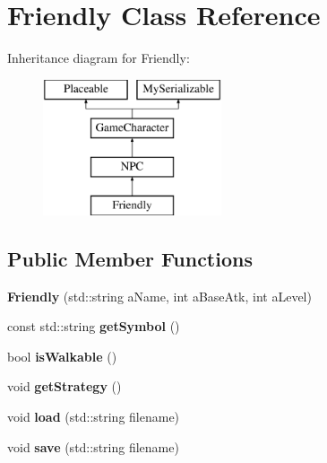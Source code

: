 \hypertarget{class_friendly}{}\section{Friendly Class Reference}
\label{class_friendly}
Inheritance diagram for Friendly\+:\begin{figure}[H]
\begin{center}
\leavevmode
\includegraphics[height=4.000000cm]{class_friendly}
\end{center}
\end{figure}
\subsection*{Public Member Functions}
\begin{DoxyCompactItemize}
\item 
\hypertarget{class_friendly_a659e9fb5059bd5aecccfde31268cfeae}{}\label{class_friendly_a659e9fb5059bd5aecccfde31268cfeae} 
{\bfseries Friendly} (std\+::string a\+Name, int a\+Base\+Atk, int a\+Level)
\item 
\hypertarget{class_friendly_a545e6be79496bbcf92bddf6d969119a1}{}\label{class_friendly_a545e6be79496bbcf92bddf6d969119a1} 
const std\+::string {\bfseries get\+Symbol} ()
\item 
\hypertarget{class_friendly_aa309d676f0034511f83386108798c1e2}{}\label{class_friendly_aa309d676f0034511f83386108798c1e2} 
bool {\bfseries is\+Walkable} ()
\item 
\hypertarget{class_friendly_a4fe8e4947182ee452ecb67b1a5da81e8}{}\label{class_friendly_a4fe8e4947182ee452ecb67b1a5da81e8} 
void {\bfseries get\+Strategy} ()
\item 
\hypertarget{class_friendly_a1445b856d8c440c3bee4dc1ae63c0b4f}{}\label{class_friendly_a1445b856d8c440c3bee4dc1ae63c0b4f} 
void {\bfseries load} (std\+::string filename)
\item 
\hypertarget{class_friendly_ab757441afa46a0928dc52da262318699}{}\label{class_friendly_ab757441afa46a0928dc52da262318699} 
void {\bfseries save} (std\+::string filename)
\end{DoxyCompactItemize}

